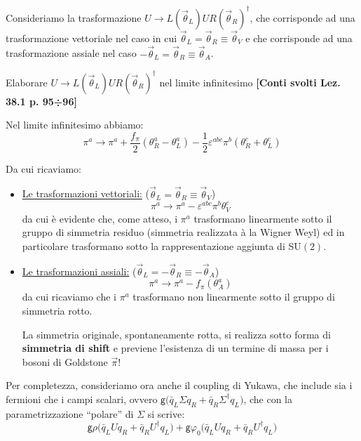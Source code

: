 \documentclass[../main.tex]{subfiles}
\begin{document}
Consideriamo la trasformazione $U\rightarrow L(\Vec\theta_L)UR(\Vec\theta_R)^\dagger$, che corrisponde ad una trasformazione vettoriale nel caso in cui $\Vec\theta_L = \Vec\theta_R \equiv \Vec\theta_V$ e che corrisponde ad una trasformazione assiale nel caso $-\Vec\theta_L = \Vec\theta_R \equiv \Vec\theta_A$.

\begin{exercise}
    Elaborare $U\rightarrow L(\Vec\theta_L)UR(\Vec\theta_R)^\dagger$ nel limite infinitesimo \textbf{[Conti svolti Lez. 38.1 p. 95÷96]}
\end{exercise}

Nel limite infinitesimo abbiamo:
\begin{equation}
    \boxed{\pi^a\rightarrow \pi^a+\frac{f_\pi}{2}(\theta_R^a-\theta_L^a) - \frac{1}{2}\varepsilon^{abc}\pi^b(\theta_R^c+\theta_L^c)}
    \label{eq:pi_fields_infinitesimal_transform}
\end{equation}

Da cui ricaviamo:
\begin{itemize}
    \item \underline{Le trasformazioni vettoriali:} ($\Vec\theta_L = \Vec\theta_R \equiv \Vec\theta_V$)
    \begin{equation}
        \boxed{\pi^a\rightarrow \pi^a - \varepsilon^{abc}\pi^b\theta_V^c}
        \label{eq:pi_fields_infinitesimal_vectorial_transform}
    \end{equation}
    da cui è evidente che, come atteso, i $\pi^a$ trasformano linearmente sotto il gruppo di simmetria residuo (simmetria realizzata à la Wigner Weyl) ed in particolare trasformano sotto la rappresentazione aggiunta di SU$(2)$.
    
    \item \underline{Le trasformazioni assiali:} ($\Vec\theta_L = -\Vec\theta_R \equiv -\Vec\theta_A$)
    \begin{equation}
        \boxed{\pi^a\rightarrow \pi^a - f_\pi(\theta_A^a) }
        \label{eq:pi_fields_infinitesimal_axial_transform}
    \end{equation}
    da cui ricaviamo che i $\pi^a$ trasformano non linearmente sotto il gruppo di simmetria rotto.
    
    La simmetria originale, spontaneamente rotta, si realizza sotto forma di \textbf{simmetria di shift} e previene l'esistenza di un termine di massa per i bosoni di Goldstone $\Vec{\pi}$!
\end{itemize}

Per completezza, consideriamo ora anche il coupling di Yukawa, che include sia i fermioni che i campi scalari, ovvero $\mathsf{g}\big(\bar q_L\Sigma q_R + \bar q_R\Sigma^\dagger q_L\big)$, che con la parametrizzazione “polare” di $\Sigma$ si scrive:
\[
\mathsf{g}\rho\big(\bar q_L U q_R + \bar q_R U^\dagger q_L\big) + \mathsf{g}\varphi_0\big(\bar q_L U q_R + \bar q_R U^\dagger q_L\big)
\]
\end{document}
